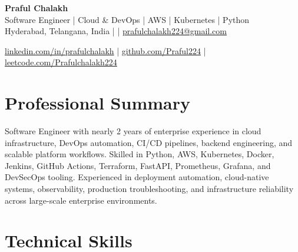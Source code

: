 \documentclass[letterpaper,9pt]{article}
\begin{document}

\begin{center}

{\Huge \bfseries Praful Chalakh} \\[2pt]

{\normalsize Software Engineer | Cloud \& DevOps | AWS | Kubernetes | Python} \\[3pt]

Hyderabad, Telangana, India \quad |  \quad | \quad
\href{mailto:prafulchalakh224@gmail.com}{prafulchalakh224@gmail.com}

\vspace{2pt}

\href{https://linkedin.com/in/prafulchalakh}{linkedin.com/in/prafulchalakh}
\quad | \quad
\href{https://github.com/Praful224}{github.com/Praful224}
\quad | \quad
\href{https://leetcode.com/Prafulchalakh224}{leetcode.com/Prafulchalakh224}

\end{center}


\section{Professional Summary}

\small{
Software Engineer with nearly 2 years of enterprise experience in cloud infrastructure, DevOps automation, CI/CD pipelines, backend engineering, and scalable platform workflows. Skilled in Python, AWS, Kubernetes, Docker, Jenkins, GitHub Actions, Terraform, FastAPI, Prometheus, Grafana, and DevSecOps tooling. Experienced in deployment automation, cloud-native systems, observability, production troubleshooting, and infrastructure reliability across large-scale enterprise environments.
}


\section{Technical Skills}
\end{document}
